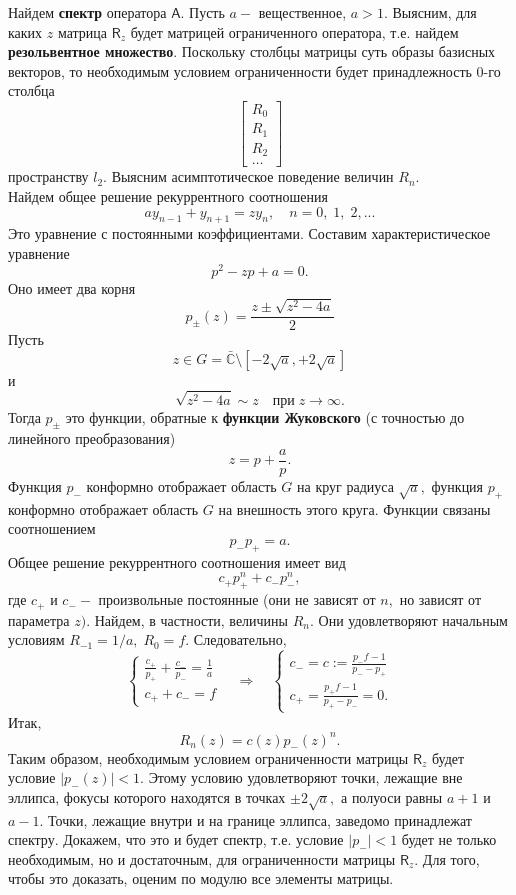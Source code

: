 \documentclass[12pt,a4paper]{article}
\theoremstyle{plain}   \newtheorem{Pro}{Задача}
\begin{document}
Найдем
{\bfseries спектр}
оператора
$ \mathsf{A} . $
Пусть
$ a - $
вещественное,
$ a>1. $
Выясним, для каких
$ z $
матрица
$ \mathsf{R}_z $
будет матрицей ограниченного оператора,
т.е. найдем
{\bfseries резольвентное множество}.
Поскольку столбцы матрицы суть образы базисных векторов, то
необходимым условием ограниченности будет принадлежность
0-го столбца
\begin{equation*}
  \begin{bmatrix}
    R_0 \\
	R_1 \\
	R_2 \\
	\dots
  \end{bmatrix}
\end{equation*}
пространству
$ l_2 . $
Выясним асимптотическое поведение величин
$ R_n . $
\\

Найдем общее решение рекуррентного соотношения
$$
  a y_{n-1} + y_{n+1}= z y_n ,
  \quad n=0, \; 1, \; 2,...
$$
Это уравнение с постоянными коэффициентами. Составим
характеристическое уравнение
$$
  p^2 -zp +a =0.
$$
Оно имеет два корня
$$
  p_{\pm}(z)=\frac{z \pm \sqrt{z^2 -4a}}{2}
$$
Пусть
$$
  z \in G = \bar{\mathbb{C}} \setminus
  [-2 \sqrt{a}, +2\sqrt{a}]
$$
и
$$
  \sqrt{z^2 -4a} \sim z \quad при \; z \rightarrow \infty .
$$
Тогда
$ p_{\pm} $
это функции, обратные к
{\bfseries функции Жуковского}
(с точностью до линейного преобразования)
$$
  z=p+\frac{a}{p}.
$$
Функция
$ p_- $
конформно отображает область
$ G $
на круг радиуса
$ \sqrt{a} ,$
функция
$ p_+ $
конформно отображает область
$ G $
на внешность этого круга. Функции связаны соотношением
$$
  p_- p_+ =a.
$$
Общее решение рекуррентного соотношения имеет вид
$$
  c_+ p_+ ^n + c_- p_- ^n ,
$$
где
$ c_+ $ и $ c_- - $
произвольные постоянные (они не зависят от
$ n ,$
но зависят от параметра
$ z ). $
Найдем, в частности, величины
$ R_n . $
Они удовлетворяют начальным условиям
$ R_{-1}=1/a , \; R_0 =f. $
Следовательно,
\begin{equation*}
  \begin{cases}
    \frac{c_+}{p_+}+\frac{c_-}{p_-} =\frac{1}{a}\\
	c_+ +c_- =f
  \end{cases}
  \quad \Rightarrow \quad
  \begin{cases}
    c_- =c := \frac{p_- f -1}{p_- -p_+}\\
	c_+ = \frac{p_+ f -1 }{p_+ - p_- } =0.
  \end{cases}
\end{equation*}
Итак,
$$
  R_n (z) = c(z) p_- (z)^n .
$$
Таким образом, необходимым условием ограниченности матрицы
$ \mathsf{R}_z $
будет условие
$ |p_- (z) | < 1 . $
Этому условию удовлетворяют точки, лежащие вне эллипса,
фокусы которого находятся в точках
$ \pm 2 \sqrt{a} , $
а полуоси равны
$ a+1 $ и $ a-1 . $
Точки, лежащие внутри и на границе эллипса, заведомо принадлежат
спектру. Докажем, что это и будет спектр, т.е. условие
$ |p_- |<1 $
будет не только необходимым, но и достаточным, для ограниченности
матрицы
$ \mathsf{R}_z .$
Для того, чтобы это доказать, оценим по модулю все элементы матрицы.
\\
\end{document}
